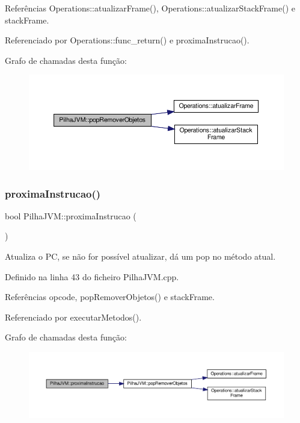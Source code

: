 Referências Operations\+::atualizar\+Frame(), Operations\+::atualizar\+Stack\+Frame() e stack\+Frame.



Referenciado por Operations\+::func\+\_\+return() e proxima\+Instrucao().

Grafo de chamadas desta função\+:
\nopagebreak
\begin{figure}[H]
\begin{center}
\leavevmode
\includegraphics[width=350pt]{classPilhaJVM_a4f83f8d59b436cb1813a2a35e1538045_cgraph}
\end{center}
\end{figure}
\mbox{\label{classPilhaJVM_a914a4707e58e23e8913fcdc0c53f8c5c}} 
\subsubsection{\texorpdfstring{proxima\+Instrucao()}{proximaInstrucao()}}
{\footnotesize\ttfamily bool Pilha\+J\+V\+M\+::proxima\+Instrucao (\begin{DoxyParamCaption}{ }\end{DoxyParamCaption})\hspace{0.3cm}{\ttfamily [private]}}



Atualiza o PC, se não for possível atualizar, dá um pop no método atual. 



Definido na linha 43 do ficheiro Pilha\+J\+V\+M.\+cpp.



Referências opcode, pop\+Remover\+Objetos() e stack\+Frame.



Referenciado por executar\+Metodos().

Grafo de chamadas desta função\+:
\nopagebreak
\begin{figure}[H]
\begin{center}
\leavevmode
\includegraphics[width=350pt]{classPilhaJVM_a914a4707e58e23e8913fcdc0c53f8c5c_cgraph}
\end{center}
\end{figure}


